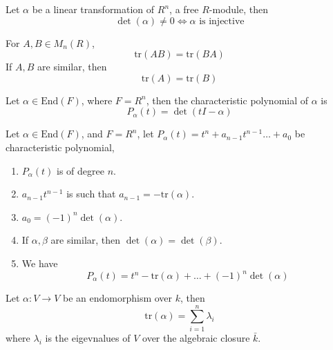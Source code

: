 \documentclass[openany]{book}
\newcommand{\tr}{\text{tr}}
\begin{document}
\begin{prop}
    Let $\alpha$ be a linear transformation of $R^n$, a free $R$-module, then 
    \begin{equation*}
        \det(\alpha)\neq 0\iff \alpha\text{ is injective}
    \end{equation*}
\end{prop}
\begin{prop}
    For $A,B\in M_n(R)$, 
    \begin{equation*}
        \tr(AB)=\tr(BA)
    \end{equation*}
    If $A,B$ are similar, then 
    \begin{equation*}
        \tr(A)=\tr(B)
    \end{equation*}
\end{prop}

\begin{defn}
    Let $\alpha\in\text{End}(F)$, where $F=R^n$, then the characteristic polynomial of $\alpha$ is 
    \begin{equation*}
        P_\alpha(t)=\det(tI-\alpha)
    \end{equation*} 
\end{defn}

\begin{thm}
    Let $\alpha\in\text{End}(F)$, and $F=R^n$, let $P_\alpha(t)=t^n+a_{n-1}t^{n-1}\dots+a_0$ be characteristic polynomial,
    \begin{enumerate}
        \item $P_\alpha(t)$ is of degree $n$.
        \item $a_{n-1}t^{n-1}$ is such that $a_{n-1}=-\tr(\alpha)$.
        \item $a_0=(-1)^n\det(\alpha)$.
        \item If $\alpha,\beta$ are similar, then $\det(\alpha)=\det(\beta)$. 
        \item We have 
        \begin{equation*}
            P_\alpha(t)=t^n-\tr(\alpha)+\dots+(-1)^n\det(\alpha)
        \end{equation*}
    \end{enumerate}
\end{thm}

\begin{thm}
    Let $\alpha:V\to V$ be an endomorphism over $k$, then 
    \begin{equation*}
        \tr(\alpha)=\sum_{i=1}^n\lambda_i
    \end{equation*}
    where $\lambda_i$ is the eigevnalues of $V$ over the algebraic closure $\bar{k}$.
\end{thm}
\end{document}
